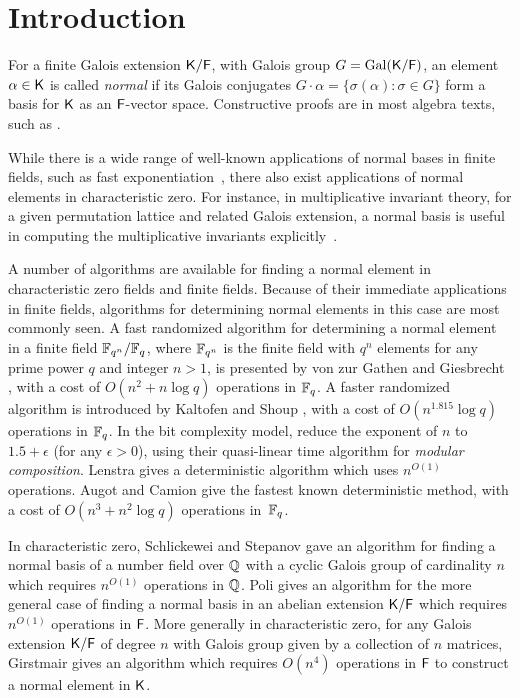 \section{Introduction}

For a finite Galois extension ${\mathsf{K}}/{\mathsf{F}}$, with Galois group $G =
\mathrm{Gal}({\mathsf{K}}/{\mathsf{F}})$, an element $\alpha \in {\mathsf{K}}$ is called
\emph{normal} if its Galois conjugates $G \cdot \alpha = \{
\sigma(\alpha): \sigma\in G\}$ form a basis for ${\mathsf{K}}$ as an ${\mathsf{F}}$-vector
space. Constructive proofs are in most algebra texts, such as
\cite[\S6.13]{Lang}.

 
While there is a wide range of well-known applications of normal bases in
finite fields, such as fast exponentiation~\cite{GaGaPaSh00}, there also
exist applications of normal elements in characteristic zero.  For instance,
in multiplicative invariant theory, for a given permutation lattice and
related Galois extension, a normal basis is useful in computing the
multiplicative invariants explicitly~\cite{Jam18}.

A number of algorithms are available for finding a normal element in
characteristic zero fields and finite fields.  Because of their immediate
applications in finite fields, algorithms for determining normal elements
in this case are most commonly seen.  A fast randomized algorithm for
determining a normal element in a finite field ${\mathbb{F}}_{q^n}/{\mathbb{F}}_q$, where
${\mathbb{F}}_{q^n}$ is the finite field with $q^n$ elements for any prime power $q$
and integer $n>1$, is presented by von zur Gathen and Giesbrecht , with a cost of
$O(n^2+n\log q)$ operations in ${\mathbb{F}}_q$.  A faster randomized algorithm is
introduced by Kaltofen and Shoup , with a cost of $O(n^{1.815}\log q)$
operations in ${\mathbb{F}}_q$.  In the bit complexity model, \citet{KeUm11} 
reduce the exponent of $n$ to $1.5+\epsilon$ (for any
$\epsilon > 0$), using their quasi-linear time algorithm for
{\em modular composition}. Lenstra  gives a
deterministic algorithm which uses $n^{O(1)}$
operations. Augot and Camion  give the fastest known deterministic method,
with a cost of $O(n^3+n^2\log q)$ operations in~${\mathbb{F}}_q$.

In characteristic zero, Schlickewei and Stepanov  gave an algorithm for finding
a normal basis of a number field over $\mathbb{Q}$ with a cyclic Galois group
of cardinality $n$ which requires $n^{O(1)}$ operations in $\mathbb{Q}$. Poli  gives an algorithm for the more general case of finding
a normal basis in an abelian extension ${\mathsf{K}}/{\mathsf{F}}$ which requires
$n^{O(1)}$ operations in ${\mathsf{F}}$.  More generally in characteristic zero, for any
Galois extension ${\mathsf{K}}/{\mathsf{F}}$ of degree $n$ with Galois group given by a
collection of $n$ matrices, Girstmair  gives an algorithm which
requires $O(n^4)$ operations in ${\mathsf{F}}$ to construct a normal element in
${\mathsf{K}}$.


